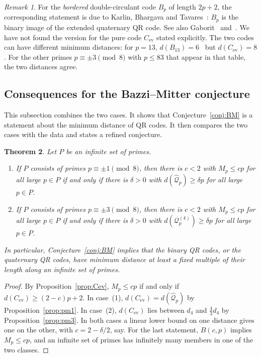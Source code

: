 \documentclass[12pt,letterpaper]{article}
\newtheorem{theorem}{Theorem}[section]
\theoremstyle{definition}
\theoremstyle{remark}
\newtheorem{remark}[theorem]{Remark}
\numberwithin{equation}{section}
\newcommand{\Cev}{C_{\mathrm{ev}}}
\begin{document}
\begin{remark}
For the \emph{bordered} double-circulant code $B_p$ of length $2p+2$, the
corresponding statement is due to Karlin, Bhargava and Tavares~\cite{KBT78}: $B_p$
is the binary image of the extended quaternary QR code. See also
Gaborit~\cite{Ga02} and~\cite[\S9.4]{TTAAJ17}. We have not found the version for the
pure code $\Cev$ stated explicitly. The two codes can have different minimum
distances: for $p=13$, $d(B_{13})=6$~\cite[Table~9.4]{TTAAJ17} but $d(\Cev)=8$. For
the other primes $p\equiv\pm3\pmod 8$ with $p\le83$ that appear in that table,
the two distances agree.
\end{remark}

\subsection{Consequences for the Bazzi--Mitter conjecture}

This subsection combines the two cases. It shows that Conjecture~\ref{conj:BM} is
a statement about the minimum distance of QR codes. It then compares the two cases
with the data and states a refined conjecture.

\begin{theorem}\label{thm:mod8}
Let $P$ be an infinite set of primes.
\begin{enumerate}
\item If $P$ consists of primes $p\equiv\pm1\pmod8$, then there is $c<2$ with
$M_p\le cp$ for all large $p\in P$ if and only if there is $\delta>0$ with
$d(\widehat{\mathcal Q}_p)\ge\delta p$ for all large $p\in P$.
\item If $P$ consists of primes $p\equiv\pm3\pmod8$, then there is $c<2$ with
$M_p\le cp$ for all large $p\in P$ if and only if there is $\delta>0$ with
$d(\mathcal Q^{(4)}_p)\ge\delta p$ for all large $p\in P$.
\end{enumerate}
In particular, Conjecture~\ref{conj:BM} implies that the binary QR codes, or the
quaternary QR codes, have minimum distance at least a fixed multiple of their
length along an infinite set of primes.
\end{theorem}

\begin{proof}
By Proposition~\ref{prop:Cev}, $M_p\le cp$ if and only if
$d(\Cev)\ge(2-c)p+2$. In case~(1), $d(\Cev)=d(\widehat{\mathcal Q}_p)$ by
Proposition~\ref{prop:pm1}. In case~(2), $d(\Cev)$ lies between $d_4$ and
$\frac43d_4$ by Proposition~\ref{prop:pm3}. In both cases a linear lower bound on
one distance gives one on the other, with $c=2-\delta/2$, say. For the last
statement, $B(c,p)$ implies $M_p\le cp$, and an infinite set of primes has
infinitely many members in one of the two classes.
\end{proof}
\end{document}
